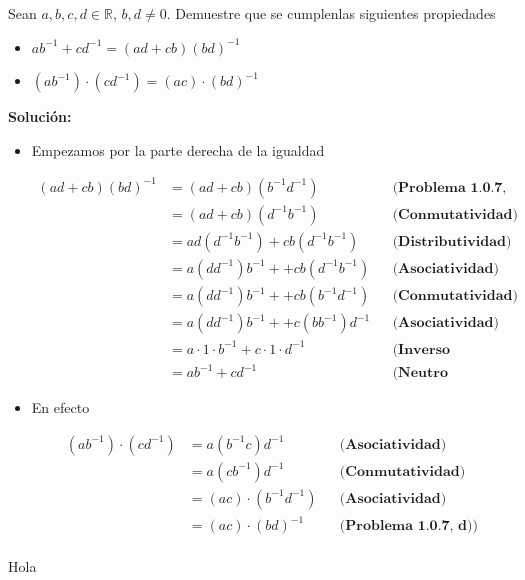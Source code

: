 \documentclass[12pt]{book}
\begin{document}
\begin{prob}
    Sean $a,b,c,d \in \mathbb{R}$, $b,d \neq 0$. Demuestre que se cumplenlas siguientes propiedades

    \begin{itemize}
        \item[\textbf{a)}] $ab^{-1} + cd^{-1}=(ad+cb)(bd)^{-1}$

        \item[\textbf{b)}] $(ab^{-1})\cdot (cd^{-1})=(ac)\cdot (bd)^{-1}$

        
    \end{itemize}
\end{prob}
\textbf{Solución:}

\begin{itemize} 
     \item[\textbf{a)}] Empezamos por la parte derecha de la igualdad

     \begin{align*}
         (ad+cb)(bd)^{-1}&=(ad+cb)(b^{-1}d^{-1}) && \textbf{(Problema 1.0.7, d))} \\
         &=(ad+cb)(d^{-1}b^{-1}) && \textbf{(Conmutatividad)} \\
        &=ad(d^{-1}b^{-1})+cb(d^{-1}b^{-1}) && \textbf{(Distributividad)} \\
        &=a(dd^{-1})b^{-1}++cb(d^{-1}b^{-1}) && \textbf{(Asociatividad)} \\
        &=a(dd^{-1})b^{-1}++cb(b^{-1}d^{-1}) && \textbf{(Conmutatividad)} \\
        &=a(dd^{-1})b^{-1}++c(bb^{-1})d^{-1} && \textbf{(Asociatividad)} \\
        &=a \cdot 1 \cdot b^{-1}+ c \cdot 1 \cdot d^{-1} && \textbf{(Inverso Multiplicativo)} \\
        &=ab^{-1}+cd^{-1} && \textbf{(Neutro Multiplicativo)}
     \end{align*}

      \item[\textbf{b)}] En efecto 

      \begin{align*}
          (ab^{-1})\cdot (cd^{-1})&= a (b^{-1}c) d^{-1} && \textbf{(Asociatividad)} \\
          &=a (c b^{-1})d^{-1} && \textbf{(Conmutatividad)} \\
          &= (ac) \cdot (b^{-1}d^{-1}) && \textbf{(Asociatividad)}\\
          &= (ac) \cdot (bd)^{-1} && \textbf{(Problema 1.0.7, d))}\\
      \end{align*}
\end{itemize}

\begin{mytheo}
    Hola
\end{mytheo}
\end{document}
